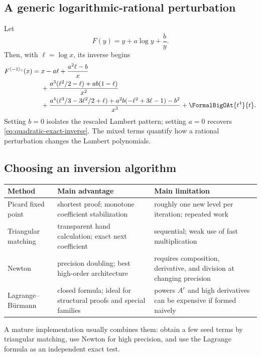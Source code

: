 \documentclass[11pt,oneside]{article}
\numberwithin{equation}{section}
\theoremstyle{definition}
\newcommand{\rev}{\langle-1\rangle_{\circ}}
\begin{document}
\subsection{A generic logarithmic-rational perturbation}

Let
\begin{equation}\label{eq:generic-ab-map}
  F(y)=y+a\log y+\frac{b}{y}.
\end{equation}
Then, with \(\ell=\log x\), its inverse begins
\begin{align}
 F^{\rev}(x)={}&x-a\ell
 +\frac{a^2\ell-b}{x}\nonumber\\
 &+\frac{a^3(\ell^2/2-\ell)+ab(1-\ell)}{x^2}\nonumber\\
 &+\frac{a^4(\ell^3/3-3\ell^2/2+\ell)
          +a^2b(-\ell^2+3\ell-1)-b^2}{x^3}
 +\FormalBigOAt{t^4}{t}.
 \label{eq:generic-ab-inverse}
\end{align}
Setting \(b=0\) isolates the rescaled Lambert pattern; setting \(a=0\)
recovers \eqref{eq:quadratic-exact-inverse}.  The mixed terms quantify how a
rational perturbation changes the Lambert polynomials.

\subsection{Choosing an inversion algorithm}

\begin{center}
\begin{tabularx}{0.97\textwidth}{@{}p{}p{}X@{}}
\toprule
Method & Main advantage & Main limitation\\
\midrule
Picard fixed point & shortest proof; monotone coefficient stabilization & roughly one new level per iteration; repeated work\\
Triangular matching & transparent hand calculation; exact next coefficient & sequential; weak use of fast multiplication\\
Newton & precision doubling; best high-order architecture & requires composition, derivative, and division at changing precision\\
Lagrange--B\"urmann & closed formula; ideal for structural proofs and special families & powers \(A^r\) and high derivatives can be expensive if formed naively\\
\bottomrule
\end{tabularx}
\end{center}

A mature implementation usually combines them: obtain a few seed terms by
triangular matching, use Newton for high precision, and use the Lagrange formula
as an independent exact test.
\end{document}
